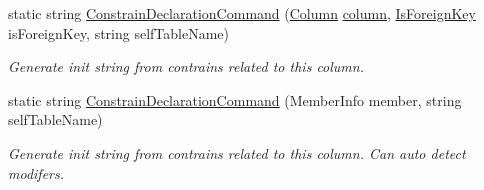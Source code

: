 \begin{DoxyCompactItemize}
static string \mbox{\hyperlink{class_uniform_data_operator_1_1_sql_1_1_attributes_1_1_is_foreign_key_a795f460cb328bfe6d471134b4d48bedf}{Constrain\+Declaration\+Command}} (\mbox{\hyperlink{class_uniform_data_operator_1_1_sql_1_1_attributes_1_1_column}{Column}} \mbox{\hyperlink{class_uniform_data_operator_1_1_sql_1_1_attributes_1_1_is_foreign_key_a8d14eef86991a9e1a187876626cbb70b}{column}}, \mbox{\hyperlink{class_uniform_data_operator_1_1_sql_1_1_attributes_1_1_is_foreign_key}{Is\+Foreign\+Key}} is\+Foreign\+Key, string self\+Table\+Name)
\begin{DoxyCompactList}\small\item\em Generate init string from contrains related to this column. \end{DoxyCompactList}\item 
static string \mbox{\hyperlink{class_uniform_data_operator_1_1_sql_1_1_attributes_1_1_is_foreign_key_ae1dae3d2e36c2c38fe5306b42209ef74}{Constrain\+Declaration\+Command}} (Member\+Info member, string self\+Table\+Name)
\begin{DoxyCompactList}\small\item\em Generate init string from contrains related to this column. Can auto detect modifers. \end{DoxyCompactList}\end{DoxyCompactItemize}

